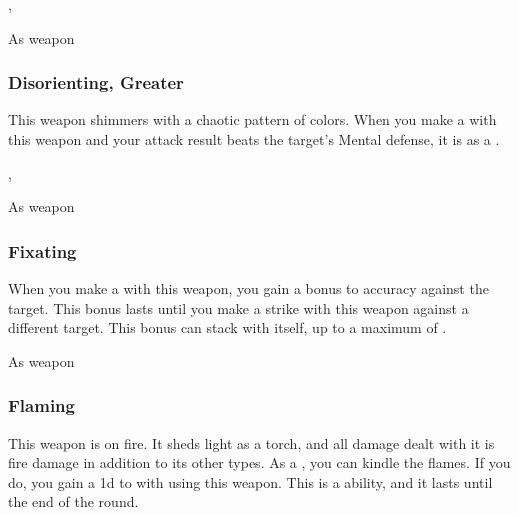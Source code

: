  , 


 As weapon


\lowercase{\hypertarget{item:Disorienting, Greater}{}}\label{item:Disorienting, Greater}
\hypertarget{item:Disorienting, Greater}{\subsubsection{Disorienting, Greater\hfill{}}}

This weapon shimmers with a chaotic pattern of colors.
When you make a  with this weapon and your attack result beats the target's Mental defense, it is \disoriented as a .



 , 


 As weapon


\lowercase{\hypertarget{item:Fixating}{}}\label{item:Fixating}
\hypertarget{item:Fixating}{\subsubsection{Fixating\hfill{}}}

When you make a  with this weapon, you gain a  bonus to accuracy against the target.
This bonus lasts until you make a strike with this weapon against a different target.
This bonus can stack with itself, up to a maximum of .



 As weapon


\lowercase{\hypertarget{item:Flaming}{}}\label{item:Flaming}
\hypertarget{item:Flaming}{\subsubsection{Flaming\hfill{}}}

This weapon is on fire.
It sheds light as a torch, and all damage dealt with it is fire damage in addition to its other types.
As a , you can kindle the flames.
If you do, you gain a \plus1d  to  with  using this weapon.
This is a  ability, and it lasts until the end of the round.



 


